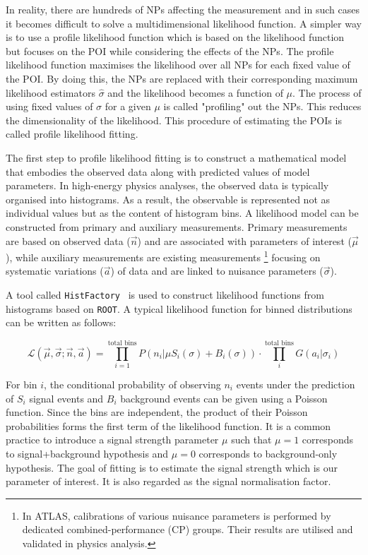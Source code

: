In reality, there are hundreds of NPs affecting the measurement and in such cases it becomes difficult to
solve a multidimensional likelihood function. A simpler way is to use a profile likelihood function
which is based on the likelihood function but focuses on the POI while considering the effects of
the NPs. The profile likelihood function maximises the likelihood over all NPs for each fixed value 
of the POI. By doing this, the NPs are replaced with their corresponding maximum likelihood
estimators $\hat{\sigma}$ and the likelihood becomes a function of $\mu$. The process of 
using fixed values of $\sigma$ for a given $\mu$ is called "profiling" out the NPs. This reduces 
the dimensionality of the likelihood. This procedure of estimating the POIs is called profile likelihood fitting.
    
The first step to profile likelihood fitting is to construct a mathematical
model that embodies the observed data along with predicted 
values of model parameters. In high-energy physics analyses, the observed data is 
typically organised into histograms. As a result, the observable 
is represented not as individual values but as the content of 
histogram bins. A likelihood model can be constructed
from primary and auxiliary measurements. Primary measurements are 
based on observed data ($\vec{n}$) and are associated with parameters of interest ($\vec{\mu}$), 
while auxiliary measurements are existing measurements \footnote{In ATLAS, calibrations of various nuisance parameters is performed
by dedicated combined-performance (CP) groups. Their results are utilised and validated in physics analysis.} 
focusing on systematic variations ($\vec{a}$) of data 
and are linked to nuisance parameters ($\vec{\sigma}$). 

A tool called \texttt{HistFactory}~\cite{Cranmer:1456844} is used to construct likelihood functions
from histograms based on \texttt{ROOT}. A typical likelihood function for binned 
distributions can be written as follows:

\begin{equation}
    \mathcal{L}(\vec{\mu},\vec{\sigma} ; \vec{n},\vec{a}) = \prod_{i=1}^{\text{total bins}} P(n_i|\mu S_i(\sigma)+B_i(\sigma)) \cdot \prod_{i}^{\text{total bins}} G(a_i|\sigma_i)
\end{equation}

For bin $i$, the conditional probability of observing $n_i$ events under the 
prediction of $S_i$ signal events and $B_i$ background events can be 
given using a Poisson function. Since the bins are independent, the product of 
their Poisson probabilities forms the first term of the likelihood function. 
It is a common practice to introduce a signal strength
parameter $\mu$ such that $\mu=1$ corresponds to signal+background hypothesis and $\mu=0$
corresponds to background-only hypothesis. The goal of fitting is to estimate the 
signal strength which is our parameter of interest. It is also regarded as the signal normalisation factor.

